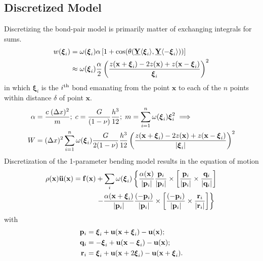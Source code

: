 \documentclass[preprint,review,12pt]{elsarticle}
\newcommand\vstate[3]{%
	\mathbf{\underline{#1}}%
	\ifstrempty{#2}{}{[#2]}%
	\ifstrempty{#3}{}{\langle #3 \rangle}}
\begin{document}
\subsection{Discretized Model}
Discretizing the bond-pair model is primarily matter of exchanging integrals for sums. 
%
\begin{align}
w(\boldsymbol{\xi}_i) &= \omega(\boldsymbol{\xi}_i)\alpha \left[1+\cos(\theta(\vstate{Y}{}{\boldsymbol{\xi}_i},\vstate{Y}{}{-\boldsymbol{\xi}_i})) \right] \notag \\
&\approx \omega(\boldsymbol{\xi}_i)\frac{\alpha}{2}\left(\frac{z(\mathbf{x}+\boldsymbol{\xi}_i)-2z(\mathbf{x})+z(\mathbf{x}-\boldsymbol{\xi}_i)}{\boldsymbol{\xi}_i}\right)^2 \notag
\end{align}
%
in which $\boldsymbol{\xi}_i$ is the $i^\textnormal{th}$ bond emanating from the point $\mathbf{x}$ to each of the $n$ points within distance $\delta$ of point $\mathbf{x}$.
%
\begin{align}
    \alpha &= \frac{c\; (\Delta x)^2}{m} ;\; c= \frac{G}{(1-\nu)}\frac{h^3}{12};\; m=\sum_{i=1}^n \omega(\boldsymbol{\xi}_i)\boldsymbol{\xi}_i^2 \implies \nonumber \\
    W&=(\Delta x)^2 \sum_{i=1}^n \omega(\boldsymbol{\xi}_i)\frac{G}{2(1-\nu)}\frac{h^3}{12}\left(\frac{z(\mathbf{x}+\boldsymbol{\xi}_i)-2z(\mathbf{x})+z(\mathbf{x}-\boldsymbol{\xi}_i)}{|\boldsymbol{\xi}_i|}\right)^2 \notag
\end{align}
%
Discretization of the 1-parameter bending model results in the equation of motion
%
\begin{align}
    \label{eq:discreteEoM}
    \rho(\mathbf{x})\mathbf{\ddot{u}}(\mathbf{x}) = \mathbf{f}(\mathbf{x})&+\sum_i \omega(\boldsymbol{\xi}_i)\left\{\frac{\alpha(\mathbf{x})}{|\mathbf{p}_i |}\frac{\mathbf{p}_i}{|\mathbf{p}_i |}\times \left[ \frac{\mathbf{p}_i}{|\mathbf{p}_i |}\times \frac{\mathbf{q}_i}{|\mathbf{q}_i |}\right] \right.  \\
    & \left. -\frac{\alpha(\mathbf{x}+\boldsymbol{\xi}_i)}{|\mathbf{p}_i |}\frac{(-\mathbf{p}_i)}{|\mathbf{p}_i |}\times\left[\frac{(-\mathbf{p}_i)}{|\mathbf{p}_i |}\times \frac{\mathbf{r}_i}{|\mathbf{r}_i |} \right] \right\} \notag
\end{align}
with
\begin{align}
    \mathbf{p}_i &= \boldsymbol{\xi}_i+\mathbf{u}(\mathbf{x}+\boldsymbol{\xi}_i)-\mathbf{u}(\mathbf{x});\notag\\
    \mathbf{q}_i &= -\boldsymbol{\xi}_i+\mathbf{u}(\mathbf{x}-\boldsymbol{\xi}_i)-\mathbf{u}(\mathbf{x});\notag\\
    \mathbf{r}_i &= \boldsymbol{\xi}_i+\mathbf{u}(\mathbf{x}+2\boldsymbol{\xi}_i)-\mathbf{u}(\mathbf{x}+\boldsymbol{\xi}_i).\notag
\end{align}
%
\end{document}
